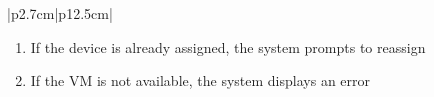 \begin{table}[H]
\begin{tabular}{|p{2.7cm}|p{12.5cm}|}
\begin{minipage}[t]{\linewidth}
                                      \begin{enumerate}[topsep=0pt,itemsep=1pt,parsep=0pt,partopsep=0pt]
                                          \item If the device is already assigned, the system prompts to reassign
                                          \item If the VM is not available, the system displays an error
                                      \end{enumerate}
                                  \end{minipage}         \\
        \hline
    \end{tabular}
    \label{tab:admin-assign-usb-to-vm}
\end{table}
